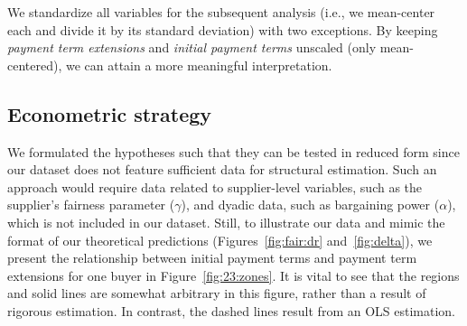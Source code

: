\documentclass[a4paper,11pt]{article}
\renewcommand{\~}[1]{\tilde{#1}}
\renewcommand{\-}[1]{\overline{#1}}
\begin{document}
We standardize all variables for the subsequent analysis (i.e., we mean-center each and divide it by its standard deviation)  with two exceptions. By keeping \textit{payment term extensions} and \textit{initial payment terms} unscaled (only mean-centered), we can attain a more meaningful interpretation.


\subsection{Econometric strategy}
We formulated the hypotheses such that they can be tested in reduced form since our dataset does not feature sufficient data for structural estimation. Such an approach would require data related to supplier-level variables, such as the supplier's fairness parameter ($\gamma$), and dyadic data, such as bargaining power ($\alpha$), which is not included in our dataset. Still, to illustrate our data and mimic the format of our theoretical predictions (Figures~\ref{fig:fair:dr} and~\ref{fig:delta}), we present the relationship between initial payment terms and payment term extensions for one buyer in Figure~\ref{fig:23:zones}. It is vital to see that the regions and solid lines are somewhat arbitrary in this figure, rather than a result of rigorous estimation. In contrast, the dashed lines result from an OLS estimation.
\end{document}
